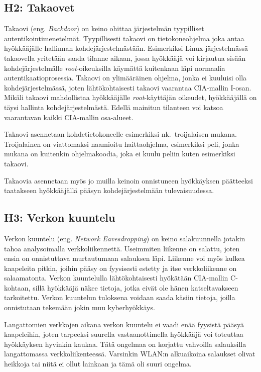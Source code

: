 \subsection{H2: Takaovet}
Takaovi (eng. \textit{Backdoor}) on keino ohittaa järjestelmän tyypilliset autentikointimenetelmät. Tyypillisesti takaovi on tietokoneohjelma joka antaa hyökkääjälle hallinnan kohdejärjestelmästään. Esimerkiksi Linux-järjestelmässä takaovella yritetään saada tilanne aikaan, jossa hyökkääjä voi kirjautua sisään kohdejärjestelmälle \textit{root}-oikeuksilla käymättä kuitenkaan läpi normaalia autentikaatioprosessia. Takaovi on ylimääräinen ohjelma, jonka ei kuuluisi olla kohdejärjestelmässä, joten lähtökohtaisesti takaovi vaarantaa CIA-mallin I-osan. Mikäli takaovi mahdollistaa hyökkääjälle \textit{root}-käyttäjän oikeudet, hyökkääjällä on täysi hallinta kohdejärjestelmästä. Edellä mainitun tilanteen voi katsoa vaarantavan kaikki CIA-mallin osa-alueet.

Takaovi asennetaan kohdetietokoneelle esimerkiksi nk.\ troijalaisen mukana. Troijalainen on viattomaksi naamioitu haittaohjelma, esimerkiksi peli, jonka mukana on kuitenkin ohjelmakoodia, joka ei kuulu peliin kuten esimerkiksi takaovi.

Takaovia asennetaan myös jo muilla keinoin onnistuneen hyökkäyksen päätteeksi taatakseen hyökkääjällä pääsyn kohdejärjestelmään tulevaisuudessa.~\cite{tipton2007information}

\subsection{H3: Verkon kuuntelu}
Verkon kuuntelu (eng. \textit{Network Eavesdropping}) on keino salakuunnella jotakin tahoa analysoimalla verkkoliikennettä. Useimmiten liikenne on salattu, joten ensin on onnistuttava murtautumaan salauksen läpi. Liikenne voi myös kulkea kaapeleita pitkin, joihin pääsy on fyysisesti estetty ja itse verkkoliikenne on salaamatonta. Verkon kuuntelulla lähtökohtaisesti hyökätään CIA-mallin C-kohtaan, sillä hyökkääjä näkee tietoja, jotka eivät ole hänen katseltavakseen tarkoitettu. Verkon kuuntelun tuloksena voidaan saada käsiin tietoja, joilla onnistutaan tekemään jokin muu kyberhyökkäys.

Langattomien verkkojen aikana verkon kuuntelu ei vaadi enää fyysistä pääsyä kaapeleihin, joten tarpeeksi suurella vastaanottimella hyökkääjä voi toteuttaa hyökkäyksen hyvinkin kaukaa. Tätä ongelmaa on korjattu vahvoilla salauksilla langattomassa verkkoliikenteessä. Varsinkin WLAN:n alkuaikoina salaukset olivat heikkoja tai niitä ei ollut lainkaan ja tämä oli suuri ongelma.~\cite{andress2014basics}

